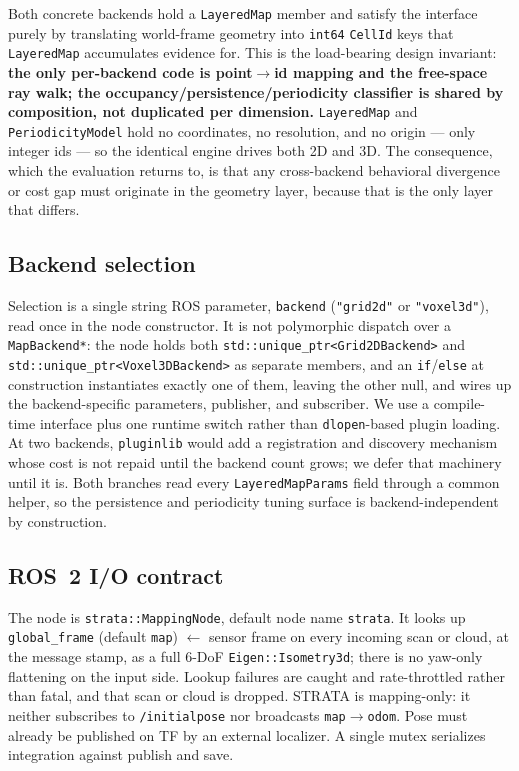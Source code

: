 \documentclass[conference]{IEEEtran}
\begin{document}
Both concrete backends hold a \texttt{LayeredMap} member and satisfy the interface
purely by translating world-frame geometry into \texttt{int64} \texttt{CellId} keys that
\texttt{LayeredMap} accumulates evidence for. This is the load-bearing design
invariant: \textbf{the only per-backend code is point$\to$id mapping and the
free-space ray walk; the occupancy/persistence/periodicity classifier is shared
by composition, not duplicated per dimension.} \texttt{LayeredMap} and
\texttt{PeriodicityModel} hold no coordinates, no resolution, and no origin --- only
integer ids --- so the identical engine drives both 2D and 3D. The consequence,
which the evaluation returns to, is that any cross-backend behavioral
divergence or cost gap must originate in the geometry layer, because that is
the only layer that differs.

\subsection{Backend selection}
\label{sec:selection}

Selection is a single string ROS parameter, \texttt{backend} (\texttt{"grid2d"} or
\texttt{"voxel3d"}), read once in the node constructor. It is not polymorphic dispatch
over a \texttt{MapBackend*}: the node holds both \texttt{std::unique\_ptr<Grid2DBackend>} and
\texttt{std::unique\_ptr<Voxel3DBackend>} as separate members, and an \texttt{if}/\texttt{else} at
construction instantiates exactly one of them, leaving the other null, and
wires up the backend-specific parameters, publisher, and subscriber. We use a
compile-time interface plus one runtime switch rather than \texttt{dlopen}-based
plugin loading. At two backends, \texttt{pluginlib} \cite{ros2pluginlib} would add a
registration and discovery mechanism whose cost is not repaid until the backend
count grows; we defer that machinery until it is. Both branches read every
\texttt{LayeredMapParams} field through a common helper, so the persistence and
periodicity tuning surface is backend-independent by construction.

\subsection{ROS~2 I/O contract}
\label{sec:io}

The node is \texttt{strata::MappingNode}, default node name \texttt{strata}. It looks up
\texttt{global\_frame} (default \texttt{map}) $\leftarrow$ sensor frame on every incoming
scan or cloud, at the message stamp, as a full 6-DoF \texttt{Eigen::Isometry3d}; there
is no yaw-only flattening on the input side. Lookup failures are caught and
rate-throttled rather than fatal, and that scan or cloud is dropped. STRATA is
mapping-only: it neither subscribes to \texttt{/initialpose} nor broadcasts
\texttt{map}$\to$\texttt{odom}. Pose must already be published on TF by an external
localizer. A single mutex serializes integration against publish and save.
\end{document}
